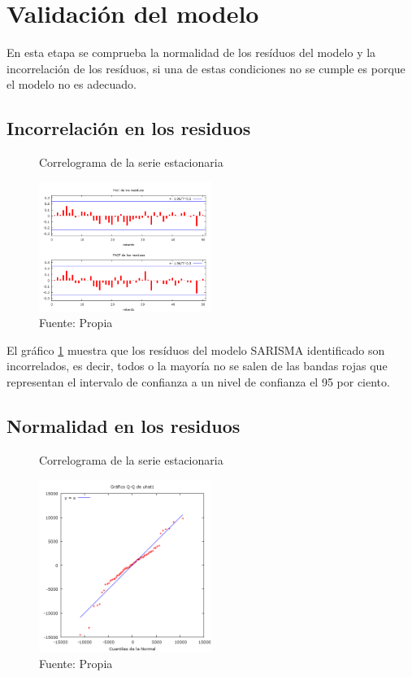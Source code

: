 \documentclass[12pt,letterpaper]{report}
\begin{document}
\section{Validación del modelo}

En esta etapa se comprueba la normalidad de los resíduos del modelo y
la incorrelación de los resíduos, si una de estas condiciones no se cumple es
porque el modelo no es adecuado.

\subsection{Incorrelación en los residuos}

\begin{figure}[htb]

\centering
\caption{Correlograma de la serie estacionaria} 
\includegraphics [width=0.5\textwidth]{Modelo}
\caption*{Fuente: Propia} \label{Graf6}

\end{figure}

El gráfico \ref{Graf6} muestra que los resíduos del modelo SARISMA identificado
son incorrelados, es decir, todos o la mayoría no se salen de las bandas rojas que representan el intervalo de confianza a un nivel de confianza el 95
por ciento.

\subsection{Normalidad en los residuos}

\begin{figure}[htb]

\centering
\caption{Correlograma de la serie estacionaria} 
\includegraphics [width=0.5\textwidth]{ModeloQQ}
\caption*{Fuente: Propia} \label{Graf7}

\end{figure}
\end{document}
